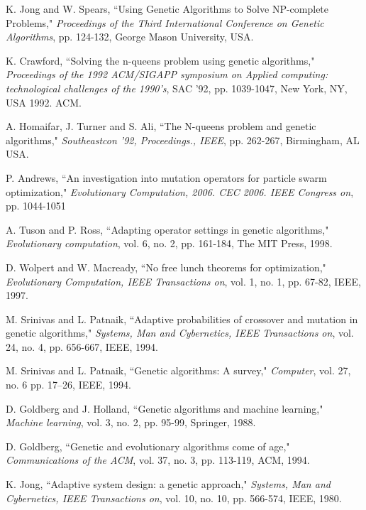 \documentclass[conference]{IEEEtran}
\begin{document}
\begin{thebibliography}{23}

 K. Jong and W. Spears, ``Using Genetic Algorithms to Solve NP-complete Problems,"
        {\it Proceedings of the Third International Conference on Genetic Algorithms}, pp. 124-132, George Mason University, USA.

 K. Crawford, ``Solving the n-queens problem using genetic algorithms,"
        {\it Proceedings of the 1992 ACM/SIGAPP symposium on Applied computing: technological challenges of the 1990's}, SAC '92, pp. 1039-1047, New York, NY, USA 1992. ACM.

 A. Homaifar, J. Turner and S. Ali, ``The N-queens problem and genetic algorithms," 
        {\it Southeastcon '92, Proceedings., IEEE}, pp. 262-267, Birmingham, AL USA.

 P. Andrews, ``An investigation into mutation operators for particle swarm optimization,"
        {\it Evolutionary Computation, 2006. CEC 2006. IEEE Congress on}, pp. 1044-1051

 A. Tuson and P. Ross, ``Adapting operator settings in genetic algorithms,"
        {\it Evolutionary computation}, vol. 6, no. 2, pp. 161-184, The MIT Press, 1998.

 D. Wolpert and W. Macready, ``No free lunch theorems for optimization,"
        {\it Evolutionary Computation, IEEE Transactions on}, vol. 1, no. 1, pp. 67-82, IEEE, 1997.

 M. Srinivas and L. Patnaik, ``Adaptive probabilities of crossover and mutation in genetic algorithms,"
        {\it Systems, Man and Cybernetics, IEEE Transactions on}, vol. 24, no. 4, pp. 656-667, IEEE, 1994.

 M. Srinivas and L. Patnaik, ``Genetic algorithms: A survey,"
        {\it Computer}, vol. 27, no. 6 pp. 17--26, IEEE, 1994.

 D. Goldberg and J. Holland, ``Genetic algorithms and machine learning,"
        {\it Machine learning}, vol. 3, no. 2, pp. 95-99, Springer, 1988.

 D. Goldberg, ``Genetic and evolutionary algorithms come of age,"
        {\it Communications of the ACM}, vol. 37, no. 3, pp. 113-119, ACM, 1994.

 K. Jong, ``Adaptive system design: a genetic approach,"
        {\it Systems, Man and Cybernetics, IEEE Transactions on}, vol. 10, no. 10, pp. 566-574, IEEE, 1980.


\end{thebibliography}
\end{document}
